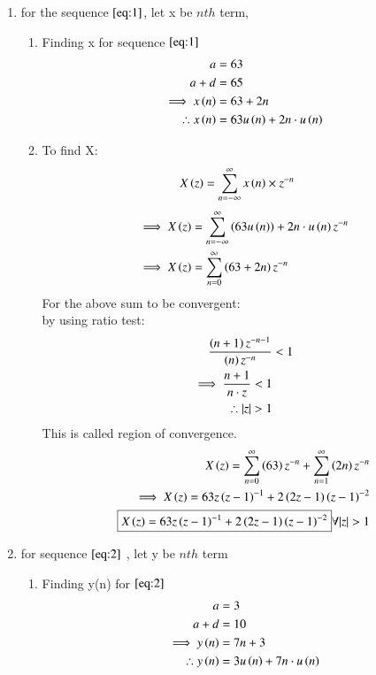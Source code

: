 \documentclass[journal,12pt,twocolumn]{IEEEtran}
\theoremstyle{remark}
\begin{document}
\begin{enumerate}
\item
for the sequence $ \eqref{eq:1}$, let x be $ nth$ term, 
\begin{enumerate}
\item
Finding x for sequence $ \eqref{eq:1}$
\begin{align}
a &= 63\\
a+d &= 65\\
\implies x\left(n\right) &= 63 + 2n \label{eq:3}\\
\therefore x\left(n\right) &= 63u\left(n\right) + 2n\cdot u\left(n\right)
\end{align}
\item
To find X:
\begin{align}
X\left(z\right) &= \sum_{n=-\infty}^{\infty} x\left(n\right)\times z^{-n}
\end{align}
\begin{align}
\implies X\left(z\right) &= \sum_{n=-\infty}^{\infty} \left(63u\left(n\right)\right) + 2n\cdot u\left(n\right)z^{-n}\\
\implies X\left(z\right) &= \sum_{n=0}^{\infty} \left(63 + 2n\right)z^{-n}
\end{align}
For the above sum to be convergent:\\
by using ratio test:\\
\begin{align}
    \frac{\brak{n+1}z^{-n-1}}{\brak{n}z^{-n}} &<1\\
   \implies \frac{n+1}{n\cdot z}<1\\
   \therefore |z|>1
\end{align}
This is called region of convergence.\\
\begin{align}
X\brak{z} = \sum_{n=0}^{\infty} \brak{63}z^{-n}+\sum_{n=1}^{\infty}\brak{2n}z^{-n}\\
\implies X\brak{z} = 63z\brak{z-1}^{-1} + 2\brak{2z-1}\brak{z-1}^{-2}\\
\boxed{X\brak{z} = 63z\brak{z-1}^{-1} + 2\brak{2z-1}\brak{z-1}^{-2}}  \forall  |z|>1 \label{eq:5}
\end{align}
\end{enumerate}
\item
for sequence $ \eqref{eq:2}$ , let y be $ nth$ term\\
\begin{enumerate}
\item 
Finding y(n) for $ \eqref{eq:2}$
\begin{align}
a &= 3 \\
a+d &= 10\\
\implies y\left(n\right) &= 7n + 3 \label{eq:4}\\
\therefore y\left(n\right) &= 3u\left(n\right) + 7n\cdot u\left(n\right) \label{eq:4}
\end{align}


\end{enumerate}
\end{enumerate}
\end{document}
